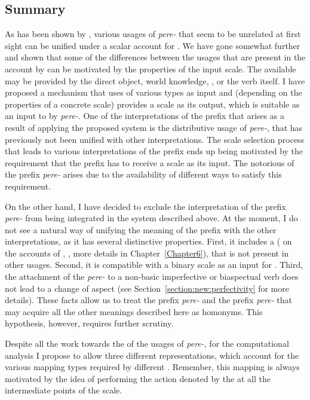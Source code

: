 \subsection{Summary}
As has been shown by \citet{Kagan:book}, various usages of \textit{pere-} that seem to be unrelated at first sight can be unified under a scalar account for . We have gone somewhat further and shown that some of the differences between the usages that are present in the account by \citet{Kagan:book} can be motivated by the properties of the input scale. The available  may be provided by the direct object, world knowledge, , or the verb itself. I have proposed a mechanism that uses  of various types as input and (depending on the properties of a concrete scale) provides a scale as its output, which is suitable as an input to  by \textit{pere-}. One of the interpretations of the prefix that arises as a result of applying the proposed system is the distributive usage of \textit{pere-}, that has previously not been unified with other interpretations. The scale selection process that leads to various interpretations of the prefix ends up being motivated by the requirement that the prefix has to receive a  scale as its input. The notorious  of the prefix \textit{pere-} arises due to the availability of different ways to satisfy this requirement. 

On the other hand, I have decided to exclude the  interpretation of the prefix \textit{pere-} from being integrated in the system described above. At the moment, I do not see a natural way of unifying the  meaning of the prefix with the other interpretations, as it has several distinctive properties. First, it includes a  ( on the accounts of \citealt{Demjjanow:97}, \citealt{Kagan:book}, more details in Chapter~\ref{Chapter6}), that is not present in other usages. Second, it is compatible with a binary scale as an input for . Third, the attachment of the  \textit{pere-} to a non-basic imperfective or biaspectual verb does not lead to a change of aspect (see Section~\ref{section:new:perfectivity} for more details). These facts allow us to treat the  prefix \textit{pere-} and the prefix \textit{pere-} that may acquire all the other meanings described here as homonyms. This hypothesis, however, requires further scrutiny.

Despite all the work towards the  of the usages of \textit{pere-}, for the computational analysis I propose to allow three different representations, which account for the various mapping types required by different . Remember, this mapping is always motivated by the idea of performing the action denoted by the  at all the intermediate points of the scale. 

